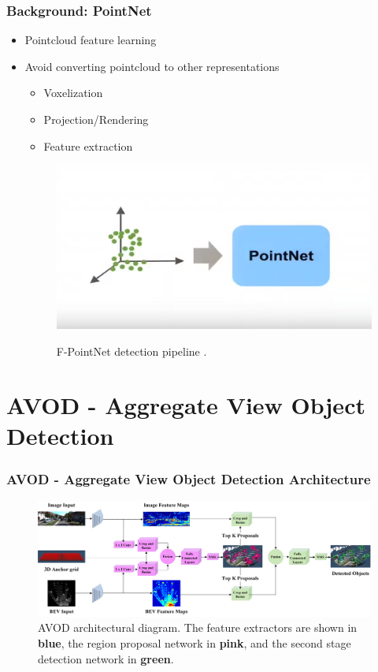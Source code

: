 \documentclass[10pt,fleqn,unknownkeysallowed]{beamer}
\begin{document}
\begin{frame}
	\frametitle{Background: PointNet}
	\linespread{1.5}
	\begin{itemize}
		\item{Pointcloud feature learning}
		\item{Avoid converting pointcloud to other representations}
		\begin{itemize}
		    \item Voxelization
		    \item Projection/Rendering
		    \item Feature extraction
		\end{itemize}
	\begin{figure}
		\includegraphics[width=0.5\linewidth]{images/pointnet/pointNet} \\
		\caption{F-PointNet detection pipeline \cite{vgg_arch}.}
	\end{figure}
	\end{itemize}
\end{frame}


\section{AVOD - Aggregate View Object Detection}
\begin{frame}
	\frametitle{AVOD - Aggregate View Object Detection Architecture}
	\begin{figure}
		\begin{center}
			\includegraphics[width=115mm]{images/Meta-Architecture}
		\end{center}
	\caption{AVOD architectural diagram. The feature extractors are shown in \textbf{blue}, the region proposal network in \textbf{pink}, and the second stage detection network in \textbf{green}.}
	\end{figure}
\end{frame}
\end{document}
